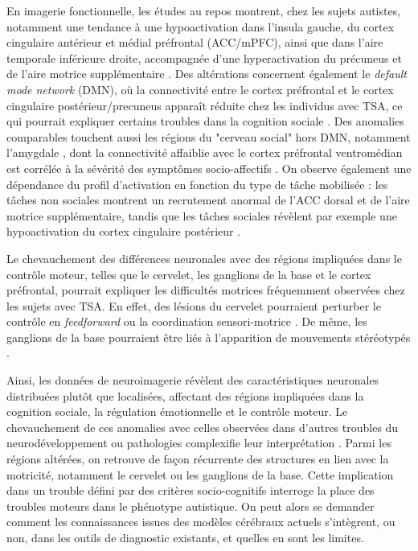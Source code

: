 En imagerie fonctionnelle, les études au repos montrent, chez les sujets autistes, notamment une tendance à une hypoactivation dans l'insula gauche, du cortex cingulaire antérieur et médial préfrontal (ACC/mPFC), ainsi que dans l'aire temporale inférieure droite, accompagnée d'une hyperactivation du précuneus et de l'aire motrice supplémentaire \parencite{Guo2024Apr}. Des altérations concernent également le \textit{default mode network} (DMN), où la connectivité entre le cortex préfrontal et le cortex cingulaire postérieur/precuneus apparaît réduite chez les individus avec TSA, ce qui pourrait expliquer certains troubles dans la cognition sociale \parencite{Sato2019Aug}. Des anomalies comparables touchent aussi les régions du "cerveau social" hors DMN, notamment l'amygdale \parencite{Sato2019Aug}, dont la connectivité affaiblie avec le cortex préfrontal ventromédian est corrélée à la sévérité des symptômes socio-affectifs \parencite{Kleinhans2015Dec}. On observe également une dépendance du profil d'activation en fonction du type de tâche mobilisée : les tâches non sociales montrent un recrutement anormal de l'ACC dorsal et de l'aire motrice supplémentaire, tandis que les tâches sociales révèlent par exemple une hypoactivation du cortex cingulaire postérieur 
\parencite{DiMartino2008Nov}.

Le chevauchement des différences neuronales avec des régions impliquées dans le contrôle moteur, telles que le cervelet, les ganglions de la base et le cortex préfrontal, pourrait expliquer les difficultés motrices fréquemment observées chez les sujets avec TSA. En effet, des lésions du cervelet pourraient perturber le contrôle en  \textit{feedforward} ou la coordination sensori-motrice \parencite{Manto2012Jun}. De même, les ganglions de la base pourraient être liés à l'apparition de mouvements stéréotypés \parencite{Groenewegen2003}. %

\medskip
Ainsi, les données de neuroimagerie révèlent des caractéristiques neuronales distribuées plutôt que localisées, affectant des régions impliquées dans la cognition sociale, la régulation émotionnelle et le contrôle moteur. Le chevauchement de ces anomalies avec celles observées dans d'autres troubles du neurodéveloppement ou pathologies complexifie leur interprétation \parencite{Guo2024Apr, Lukito2020Mar}.
Parmi les régions altérées, on retrouve de façon récurrente des structures en lien avec la motricité, notamment le cervelet ou les ganglions de la base. Cette implication dans un trouble défini par des critères socio-cognitifs interroge la place des troubles moteurs dans le phénotype autistique. On peut alors se demander comment les connaissances issues des modèles cérébraux actuels s'intègrent, ou non, dans les outils de diagnostic existants, et quelles en sont les limites.


